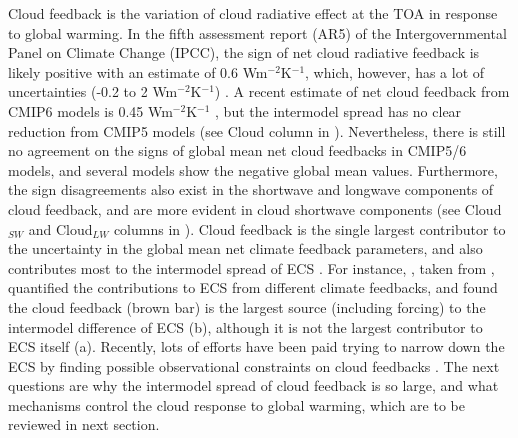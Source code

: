 Cloud feedback is the variation of cloud radiative effect at the TOA in response to global warming. In the fifth assessment report (AR5) of the Intergovernmental Panel on Climate Change (IPCC), the sign of net cloud radiative feedback is likely positive with an estimate of 0.6 Wm$^{-2}$K$^{-1}$, which, however, has a lot of uncertainties (-0.2 to 2 Wm$^{-2}$K$^{-1}$) \citep{Stocker2013}.  A recent estimate of net cloud feedback from CMIP6 models is 0.45 Wm$^{-2}$K$^{-1}$ \citep{Zelinka2020causes,Sherwood2020}, but the intermodel spread has no clear reduction from CMIP5 models (see Cloud column in ). Nevertheless, there is still no agreement on the signs of global mean net cloud feedbacks in CMIP5/6 models, and several models show the negative global mean values. Furthermore, the sign disagreements also exist in the shortwave and longwave components of cloud feedback, and are more evident in cloud shortwave components (see Cloud$_{SW}$ and Cloud$_{LW}$ columns in ). Cloud feedback is the single largest contributor to the uncertainty in the global mean net climate feedback parameters, and also contributes most to the intermodel spread of ECS \citep{Bony2005,Soden2006,Dufresne2008assessment,Colman2011tropospheric,Vial2013,Ceppi2017,Zelinka2020causes,Sherwood2020}. For instance, , taken from \cite{Dufresne2008assessment}, quantified the contributions to ECS from different climate feedbacks, and found the cloud feedback (brown bar) is the largest source (including forcing) to the intermodel difference of ECS (b), although it is not the largest contributor to ECS itself (a). Recently, lots of efforts have been paid trying to narrow down the ECS by finding possible observational constraints on cloud feedbacks \citep[e.g.,][]{Cesana2021,Myers2021}. The next questions are why the intermodel spread of cloud feedback is so large, and what mechanisms control the cloud response to global warming, which are to be reviewed in next section.



